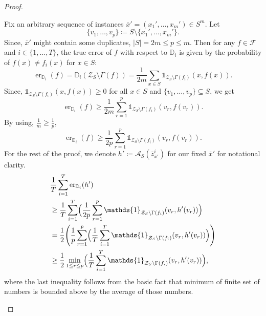 \begin{proof}
\begin{subproof}
        Fix an arbitrary sequence of instances $\overline{x}'=(x_1',\dots, x_m') \in S^m$. Let
        \[
            \{v_1, \dots, v_p\} \coloneq S \setminus \{x_1', \dots, x_m'\}.
        \]
        Since, $\overline{x}'$ might contain some duplicates, $|S| = 2m \leq p \leq m$. Then for any $f \in \mathcal{F}$ and $i \in \{1, \dots, T\}$, the true error of $f$ with respect to $\mathbb{D}_i$ is given by the probability of $f(x) \neq f_i(x)$ for $x \in S$:
        \[
            \operatorname{er}_{\mathbb{D}_i}(f) = \mathbb{D}_i(\mathcal{Z}_S\setminus\Gamma(f)) = \frac{1}{2m}\sum_{x \in S}\mathds{1}_{\mathcal{Z}_S\setminus\Gamma(f_i)}(x, f(x)).
        \]
        Since, $\mathds{1}_{\mathcal{Z}_S\setminus\Gamma(f_i)}(x, f(x)) \geq 0$ for all $x \in S$ and $\{v_1, \dots, v_p\} \subseteq S$, we get
        \[
            \operatorname{er}_{\mathbb{D}_i}(f) \geq \frac{1}{2m}\sum_{r=1}^p \mathds{1}_{\mathcal{Z}_S\setminus\Gamma(f_i)}(v_r, f(v_r)).
        \]
        By using, $\frac{1}{m} \geq \frac{1}{p}$,
        \[
            \operatorname{er}_{\mathbb{D}_i}(f) \geq \frac{1}{2p}\sum_{r=1}^p \mathds{1}_{\mathcal{Z}_S\setminus\Gamma(f_i)}(v_r, f(v_r)).
        \]
        For the rest of the proof, we denote $h' \coloneq \mathcal{A}_S(\overline{z}_{\overline{x}'}^{i})$ for our fixed $\overline{x}'$ for notational clarity.
        \[
            \begin{aligned}
                &\frac{1}{T}\sum_{i=1}^T\operatorname{er}_{\mathbb{D}_i}(h') \\
                &\geq \frac{1}{T}\sum_{i=1}^T \Bigl(\frac{1}{2p}\sum_{r=1}^p \mathds{1}_{\mathcal{Z}_S\setminus\Gamma(f_i)}(v_r, h'(v_r))\Bigr) \\
                &= \frac{1}{2}\Biggl(\frac{1}{p}\sum_{r=1}^p \Bigl(\frac{1}{T}\sum_{i=1}^T \mathds{1}_{\mathcal{Z}_S\setminus\Gamma(f_i)}(v_r, h'(v_r))\Bigr)\Biggr) \\
                &\geq \frac{1}{2} \min_{1 \leq r \leq p}\Bigl(\frac{1}{T}\sum_{i=1}^T \mathds{1}_{\mathcal{Z}_S\setminus\Gamma(f_i)}(v_r, h'(v_r))\Bigr),
            \end{aligned}
        \]
        where the last inequality follows from the basic fact that minimum of finite set of numbers is bounded above by the average of those numbers.
    \end{subproof}
\end{proof}